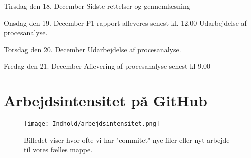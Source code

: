 Tirsdag den 18. December                     Sidste rettelser og gennemlæsning

Onsdag den 19. December                    P1 rapport afleveres senest kl. 12.00
	Udarbejdelse af procesanalyse.

Torsdag den 20. December	Udarbejdelse af procesanalyse.

Fredag den 21. December                    Aflevering af procesanalyse senest kl 9.00


\section{Arbejdsintensitet på GitHub}
\label{bilag2}
\begin{figure}[H]
\texttt{[image: Indhold/arbejdsintensitet.png]}
\caption {Billedet viser hvor ofte vi har "commitet" nye filer eller nyt arbejde til vores fælles mappe.}
\label {arbejde}
\end{figure}
